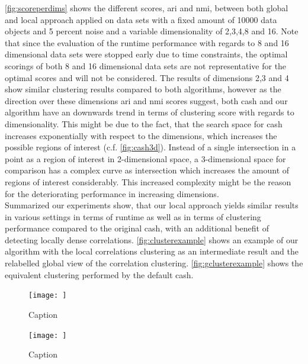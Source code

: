 \autoref{fig:scoreperdims} shows the different scores, \gls{ari} and \gls{nmi}, between both global and local approach applied on data sets with a fixed amount of 10000 data objects and 5 percent noise and a variable dimensionality of 2,3,4,8 and 16.
Note that since the evaluation of the runtime performance with regards to 8 and 16 dimensional data sets were stopped early due to time constraints, the optimal scorings of both 8 and 16 dimensional data sets are not representative for the optimal scores and will not be considered. 
The results of dimensions 2,3 and 4 show similar clustering results compared to both algorithms, however as the direction over these dimensions \gls{ari} and \gls{nmi} scores suggest, both \gls{cash} and our algorithm have an downwards trend in terms of clustering score with regards to dimensionality. This might be due to the fact, that the search space for \gls{cash} increases exponentially with respect to the dimensions, which increases the possible regions of interest (c.f. \autoref{fig:cash3d}). Instead of a single intersection in a point as a region of interest in 2-dimensional space, a 3-dimensional space for comparison has a complex curve as intersection which increases the amount of regions of interest considerably. This increased complexity might be the reason for the deteriorating performance in increasing dimensions. \\

Summarized our experiments show, that our local approach yields similar results in various settings in terms of runtime as well as in terms of clustering performance compared to the original \gls{cash}, with an additional benefit of detecting locally dense correlations. \autoref{fig:clusterexample} shows an example of our algorithm with the local correlations clustering as an intermediate result and the relabelled global view of the correlation clustering. \autoref{fig:gclusterexample} shows the equivalent clustering performed by the default \gls{cash}. 

\begin{figure}
    \centering
    \texttt{[image: ]}
    \caption{Caption}
    \label{fig:clusterexample}
\end{figure}

\begin{figure}
    \centering
    \texttt{[image: ]}
    \caption{Caption}
    \label{fig:gclusterexample}
\end{figure}

